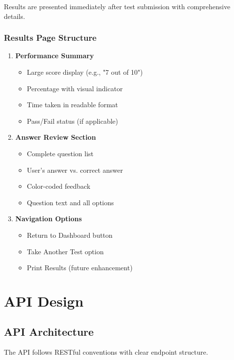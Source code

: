 \documentclass[12pt,a4paper]{report}
\begin{document}
Results are presented immediately after test submission with comprehensive details.

\subsection{Results Page Structure}

\begin{enumerate}
    \item \textbf{Performance Summary}
    \begin{itemize}
        \item Large score display (e.g., "7 out of 10")
        \item Percentage with visual indicator
        \item Time taken in readable format
        \item Pass/Fail status (if applicable)
    \end{itemize}
    
    \item \textbf{Answer Review Section}
    \begin{itemize}
        \item Complete question list
        \item User's answer vs. correct answer
        \item Color-coded feedback
        \item Question text and all options
    \end{itemize}
    
    \item \textbf{Navigation Options}
    \begin{itemize}
        \item Return to Dashboard button
        \item Take Another Test option
        \item Print Results (future enhancement)
    \end{itemize}
\end{enumerate}

\chapter{API Design}

\section{API Architecture}

The API follows RESTful conventions with clear endpoint structure.
\end{document}
